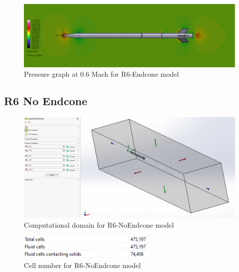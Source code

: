 \documentclass{article}
\begin{document}
\begin{figure}[H]
    \centering
    \includegraphics[width=\textwidth]{../data/R6-Endcone-Solid/pressure.png}
    \caption{Pressure graph at 0.6 Mach for R6-Endcone model}
\end{figure}

\subsection{R6 No Endcone}

\begin{figure}[H]
    \centering
    \includegraphics[width=\textwidth]{../data/R6-NoEndcone-Solid/domain.png}
    \caption{Computational domain for R6-NoEndcone model}
\end{figure}
\begin{figure}[H]
    \centering
    \includegraphics[width=0.6\textwidth]{../data/R6-NoEndcone-Solid/cells.png}
    \caption{Cell number for R6-NoEndcone model}
\end{figure}
\end{document}
